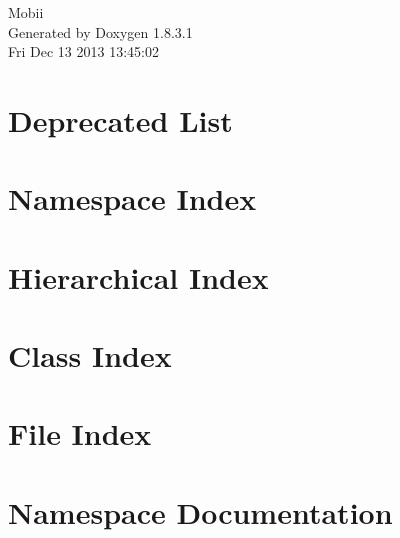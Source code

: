 \documentclass{book}
\begin{document}
\hypersetup{pageanchor=false,citecolor=blue}
\begin{titlepage}
\vspace*{7cm}
\begin{center}
{\Large Mobii }\\
\vspace*{1cm}
{\large Generated by Doxygen 1.8.3.1}\\
\vspace*{0.5cm}
{\small Fri Dec 13 2013 13:45:02}\\
\end{center}
\end{titlepage}
\clearemptydoublepage
{}
\tableofcontents
\clearemptydoublepage
{}
\hypersetup{pageanchor=true,citecolor=blue}
\chapter{Deprecated List}
\label{deprecated}
\hypertarget{deprecated}{}

\chapter{Namespace Index}

\chapter{Hierarchical Index}

\chapter{Class Index}

\chapter{File Index}

\chapter{Namespace Documentation}

\end{document}
